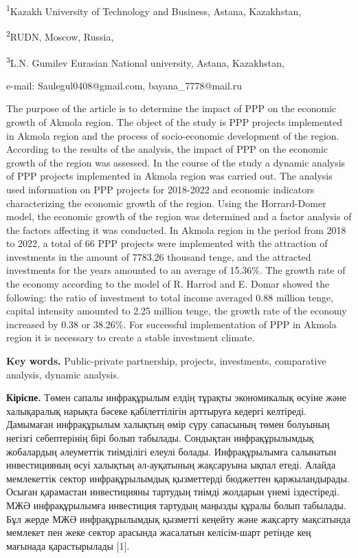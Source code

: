 \textsuperscript{1}Kazakh University of Technology and Business, Astana,
Kazakhstan,

\textsuperscript{2}RUDN, Moscow, Russia,

\textsuperscript{3}L.N. Gumilev Eurasian National university, Astana,
Kazakhstan,

e-mail: Saulegul0408@gmail.com, bayana\_7778@mail.ru

The purpose of the article is to determine the impact of PPP on the
economic growth of Akmola region. The object of the study is PPP
projects implemented in Akmola region and the process of socio-economic
development of the region. According to the results of the analysis, the
impact of PPP on the economic growth of the region was assessed. In the
course of the study a dynamic analysis of PPP projects implemented in
Akmola region was carried out. The analysis used information on PPP
projects for 2018-2022 and economic indicators characterizing the
economic growth of the region. Using the Horrard-Domer model, the
economic growth of the region was determined and a factor analysis of
the factors affecting it was conducted. In Akmola region in the period
from 2018 to 2022, a total of 66 PPP projects were implemented with the
attraction of investments in the amount of 7783.26 thousand tenge, and
the attracted investments for the years amounted to an average of
15.36\%. The growth rate of the economy according to the model of R.
Harrod and E. Domar showed the following: the ratio of investment to
total income averaged 0.88 million tenge, capital intensity amounted to
2.25 million tenge, the growth rate of the economy increased by 0.38 or
38.26\%. For successful implementation of PPP in Akmola region it is
necessary to create a stable investment climate.

{\bfseries Key words.} Public-private partnership, projects, investments,
comparative analysis, dynamic analysis.

{\bfseries Кіріспе.} Төмен сапалы инфрақұрылым елдің тұрақты экономикалық
өсуіне және халықаралық нарықта бәсеке қабілеттілігін арттыруға кедергі
келтіреді. Дамымаған инфрақұрылым халықтың өмір сүру сапасының төмен
болуының негізгі себептерінің бірі болып табылады. Сондықтан
инфрақұрылымдық жобалардың әлеуметтік тиімділігі елеулі болады.
Инфрақұрылымға салынатын инвестицияның өсуі халықтың әл-ауқатының
жақсаруына ықпал етеді. Алайда мемлекеттік сектор инфрақұрылымдық
қызметтерді бюджеттен қаржыландырады. Осыған қарамастан инвестицияны
тартудың тиімді жолдарын үнемі іздестіреді. МЖӘ инфрақұрылымға
инвестиция тартудың маңызды құралы болып табылады. Бұл жерде МЖӘ
инфрақұрылымдық қызметті кеңейту және жақсарту мақсатында мемлекет пен
жеке сектор арасында жасалатын келісім-шарт ретінде кең мағынада
қарастырылады {[}1{]}.~

